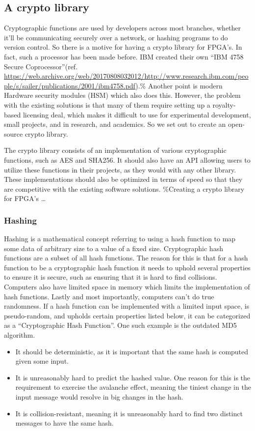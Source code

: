 \documentclass[a4paper]{article}
\begin{document}
\subsection{A crypto library}
\label{sec:org65a4581}
Cryptographic functions are used by developers across most branches, whether it'll be communicating securely over a network, or hashing programs to do version control.
So there is a motive for having a crypto library for FPGA's. In fact, such a processor has been made before. IBM created their own ``IBM 4758 Secure Coprocessor''(ref. \url{https://web.archive.org/web/20170808032012/http://www.research.ibm.com/people/s/sailer/publications/2001/ibm4758.pdf}).\% Another point is modern Hardware security modules (HSM) which also does this.
However, the problem with the existing solutions is that many of them require setting up a royalty-based licensing deal, which makes it difficult to use for experimental development, small projects, and in research, and academics.
So we set out to create an open-source crypto library.

The crypto library consists of an implementation of various cryptographic functions, such as AES and SHA256. It should also have an API allowing users to utilize these functions in their projects, as they would with any other library.
These implementations should also be optimized in terms of speed so that they are competitive with the existing software solutions.
\%Creating a crypto library for FPGA's \ldots{}
\subsubsection{Hashing}
\label{sec:org3874404}
Hashing is a mathematical concept referring to using a hash function to map some data of arbitrary size to a value of a fixed size. Cryptographic hash functions are a subset of all hash functions.
The reason for this is that for a hash function to be a cryptographic hash function it needs to uphold several properties to ensure it is secure, such as ensuring that it is hard to find collisions. Computers also have limited space in memory which limits the implementation of hash functions. Lastly and most importantly, computers can't do true randomness.
If a hash function can be implemented with a limited input space, is pseudo-random, and upholds certain properties listed below, it can be categorized as a ``Cryptographic Hash Function''. One such example is the outdated MD5 algorithm.
\begin{itemize}
\item It should be deterministic, as it is important that the same hash is computed given some input.
\item It is unreasonably hard to predict the hashed value. One reason for this is the requirement to exercise the avalanche effect, meaning the tiniest change in the input message would resolve in big changes in the hash.
\item It is collision-resistant, meaning it is unreasonably hard to find two distinct messages to have the same hash.
\end{itemize}
\end{document}
